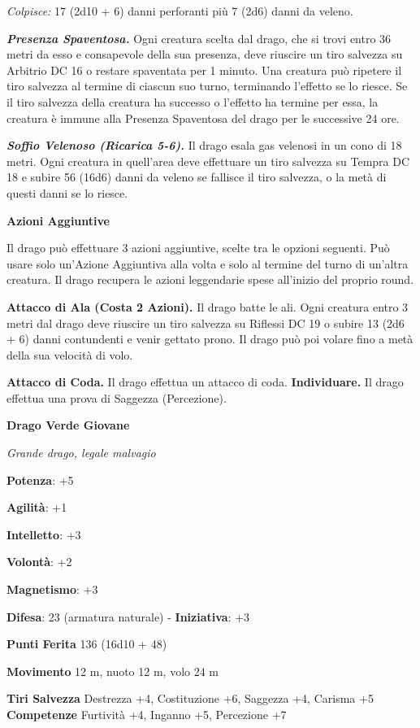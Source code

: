 \begin{multicols}{2}
\emph{Colpisce:} 17 (2d10 + 6) danni perforanti più 7 (2d6) danni da
veleno.

\emph{\textbf{Presenza Spaventosa.}} Ogni creatura scelta dal drago, che
si trovi entro 36 metri da esso e consapevole della sua presenza, deve
riuscire un tiro salvezza su Arbitrio DC 16 o restare spaventata per 1
minuto. Una creatura può ripetere il tiro salvezza al termine di ciascun
suo turno, terminando l'effetto se lo riesce. Se il tiro salvezza della
creatura ha successo o l'effetto ha termine per essa, la creatura è
immune alla Presenza Spaventosa del drago per le successive 24 ore.

\emph{\textbf{Soffio Velenoso (Ricarica 5-6).}} Il drago esala gas
velenosi in un cono di 18 metri. Ogni creatura in quell'area deve
effettuare un tiro salvezza su Tempra DC 18 e subire 56 (16d6)
danni da veleno se fallisce il tiro salvezza, o la metà di questi danni
se lo riesce.

\textbf{Azioni Aggiuntive}

Il drago può effettuare 3 azioni aggiuntive, scelte tra le opzioni
seguenti. Può usare solo un'Azione Aggiuntiva alla volta e solo al
termine del turno di un'altra creatura. Il drago recupera le azioni
leggendarie spese all'inizio del proprio round.

\textbf{Attacco di Ala (Costa 2 Azioni).} Il drago batte le ali. Ogni
creatura entro 3 metri dal drago deve riuscire un tiro salvezza su Riflessi DC 19 o subire 13 (2d6 + 6) danni contundenti e venir gettato
prono. Il drago può poi volare fino a metà della sua velocità di volo.

\textbf{Attacco di Coda.} Il drago effettua un attacco di coda.
\textbf{Individuare.} Il drago effettua una prova di Saggezza
(Percezione).

\textbf{Drago Verde Giovane}

\emph{Grande drago, legale malvagio}

\textbf{Potenza}: +5

\textbf{Agilità}: +1

\textbf{Intelletto}: +3

\textbf{Volontà}: +2

\textbf{Magnetismo}: +3

\textbf{Difesa}: 23 (armatura naturale) - \textbf{Iniziativa}: +3

\textbf{Punti Ferita} 136 (16d10 + 48)

\textbf{Movimento} 12 m, nuoto 12 m, volo 24 m

\textbf{Tiri Salvezza} Destrezza +4, Costituzione +6, Saggezza +4,
Carisma +5 \textbf{Competenze} Furtività +4, Inganno +5, Percezione +7


\end{multicols}
